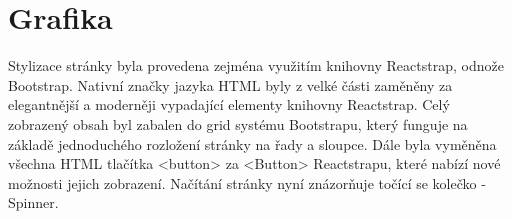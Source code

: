 \section{Grafika}
Stylizace stránky byla provedena zejména využitím knihovny Reactstrap, odnože Bootstrap. Nativní značky jazyka HTML byly z velké části zaměněny za elegantnější a moderněji vypadající elementy knihovny Reactstrap. Celý zobrazený obsah byl zabalen do grid systému Bootstrapu, který funguje na základě jednoduchého rozložení stránky na řady a sloupce. Dále byla vyměněna všechna HTML tlačítka <button> za <Button> Reactstrapu, které nabízí nové možnosti jejich zobrazení. Načítání stránky nyní znázorňuje točící se kolečko - Spinner. 
